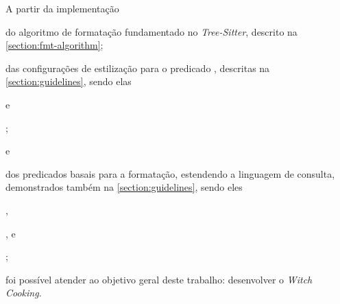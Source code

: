 \documentclass
  [11pt,a4paper,english,brazil,openright,sumario=tradicional,twoside]
  {abntex2}
\newcommand{\treesitter}{\textit{Tree-Sitter}\xspace}
\newcommand{\witchcooking}{\textit{Witch Cooking}\xspace}
\begin{document}
  A partir da implementação
  \begin{inparaenum}
    \item do algoritmo de formatação fundamentado no \treesitter, descrito na
          \cref{section:fmt-algorithm};
    \item das configurações de estilização para o predicado
          , descritas na \cref{section:guidelines},
          sendo elas
          \begin{inparaenum}
            \item {} e
            \item {};
          \end{inparaenum}
          e
    \item dos predicados basais para a formatação, estendendo a linguagem de
          consulta, demonstrados também na \cref{section:guidelines}, sendo
          eles
          \begin{inparaenum}
            \item {},
            \item {}, e
            \item {};
          \end{inparaenum}
  \end{inparaenum}
  foi possível atender ao objetivo geral deste trabalho: desenvolver o
  \witchcooking \cite{silva-2023-witch}.
\end{document}
